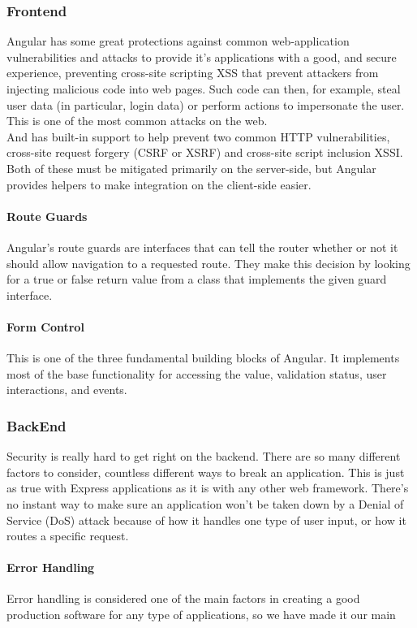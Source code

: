\subsubsection{Frontend}
Angular has some great protections against common web-application vulnerabilities and attacks to provide it's applications with a good, and secure experience, preventing cross-site scripting \ac{XSS} that prevent attackers from injecting malicious code into web pages. Such code can then, for example, steal user data (in particular, login data) or perform actions to impersonate the user. This is one of the most common attacks on the web.\\
And has built-in support to help prevent two common HTTP vulnerabilities, cross-site request forgery (\ac{CSRF} or XSRF) and cross-site script inclusion \ac{XSSI}. Both of these must be mitigated primarily on the server-side, but Angular provides helpers to make integration on the client-side easier.

\paragraph*{Route Guards}
Angular’s route guards are interfaces that can tell the router whether or not it should allow navigation to a requested route. They make this decision by looking for a true or false return value from a class that implements the given guard interface.
\paragraph*{Form Control}
This is one of the three fundamental building blocks of Angular. It implements most of the base functionality for accessing the value, validation status, user interactions, and events.
\subsubsection{BackEnd}
Security is really hard to get right on the backend. There are so many different factors to consider, countless different ways to break an application. 
This is just as true with Express applications as it is with any other web framework. There's no instant way to make sure an application won't be taken down by a Denial of Service (DoS) attack because of how it handles one type of user input, or how it routes a specific request.
\paragraph*{Error Handling}
Error handling is considered one of the main factors in creating a good production software for any type of applications, so we have made it our main 
